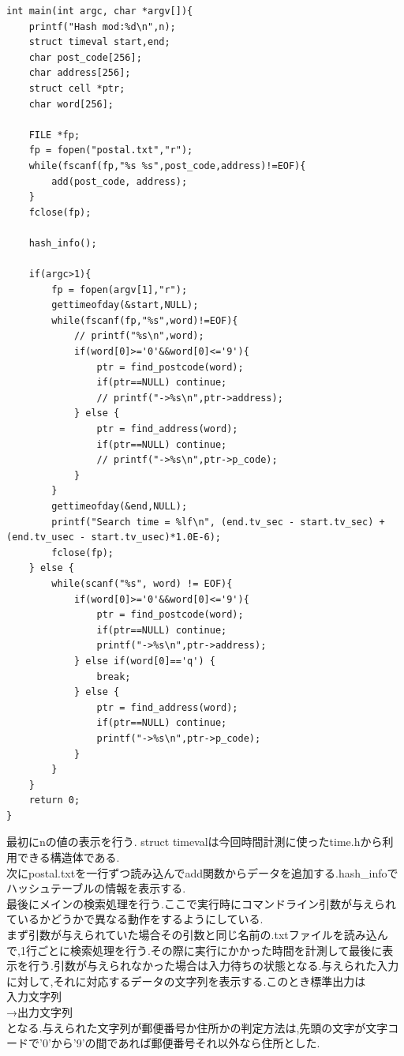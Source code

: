 \documentclass{jsarticle}
\begin{document}
\begin{lstlisting}[caption = kadai.c main]
int main(int argc, char *argv[]){
    printf("Hash mod:%d\n",n);
    struct timeval start,end;
    char post_code[256];
    char address[256];
    struct cell *ptr;
    char word[256];

    FILE *fp;
    fp = fopen("postal.txt","r");
    while(fscanf(fp,"%s %s",post_code,address)!=EOF){
        add(post_code, address);
    }
    fclose(fp);

    hash_info();

    if(argc>1){
        fp = fopen(argv[1],"r");
        gettimeofday(&start,NULL);
        while(fscanf(fp,"%s",word)!=EOF){
            // printf("%s\n",word);
            if(word[0]>='0'&&word[0]<='9'){
                ptr = find_postcode(word);
                if(ptr==NULL) continue;
                // printf("->%s\n",ptr->address);
            } else {
                ptr = find_address(word);
                if(ptr==NULL) continue;
                // printf("->%s\n",ptr->p_code);
            }
        }
        gettimeofday(&end,NULL);
        printf("Search time = %lf\n", (end.tv_sec - start.tv_sec) + (end.tv_usec - start.tv_usec)*1.0E-6);
        fclose(fp);
    } else {
        while(scanf("%s", word) != EOF){
            if(word[0]>='0'&&word[0]<='9'){
                ptr = find_postcode(word);
                if(ptr==NULL) continue;
                printf("->%s\n",ptr->address);
            } else if(word[0]=='q') {
                break;
            } else {
                ptr = find_address(word);
                if(ptr==NULL) continue;
                printf("->%s\n",ptr->p_code);
            }
        }
    }
    return 0;
}
\end{lstlisting}
最初にnの値の表示を行う. struct timevalは今回時間計測に使ったtime.hから利用できる構造体である.\\
次にpostal.txtを一行ずつ読み込んでadd関数からデータを追加する.hash\_infoでハッシュテーブルの情報を表示する.\\
最後にメインの検索処理を行う.ここで実行時にコマンドライン引数が与えられているかどうかで異なる動作をするようにしている.\\
まず引数が与えられていた場合その引数と同じ名前の.txtファイルを読み込んで,1行ごとに検索処理を行う.その際に実行にかかった時間を計測して最後に表示を行う.引数が与えられなかった場合は入力待ちの状態となる.与えられた入力に対して,それに対応するデータの文字列を表示する.このとき標準出力は\\
入力文字列\\
→出力文字列\\
となる.与えられた文字列が郵便番号か住所かの判定方法は,先頭の文字が文字コードで'0'から'9'の間であれば郵便番号それ以外なら住所とした.
\newpage
\end{document}
